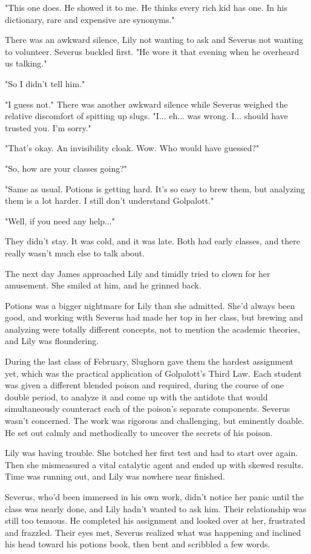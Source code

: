 "This one does. He showed it to me. He thinks every rich kid has one. In his dictionary, rare and expensive are synonyms."

There was an awkward silence, Lily not wanting to ask and Severus not wanting to volunteer. Severus buckled first. "He wore it that evening when he overheard us talking."

"So I didn't tell him."

"I guess not." There was another awkward silence while Severus weighed the relative discomfort of spitting up slugs. "I... eh... was wrong. I... should have trusted you. I'm sorry."

"That's okay. An invisibility cloak. Wow. Who would have guessed?"

"So, how are your classes going?"

"Same as usual. Potions is getting hard. It's so easy to brew them, but analyzing them is a lot harder. I still don't understand Golpalott."

"Well, if you need any help..."

They didn't stay. It was cold, and it was late. Both had early classes, and there really wasn't much else to talk about.

The next day James approached Lily and timidly tried to clown for her amusement. She smiled at him, and he grinned back.

Potions was a bigger nightmare for Lily than she admitted. She'd always been good, and working with Severus had made her top in her class, but brewing and analyzing were totally different concepts, not to mention the academic theories, and Lily was floundering.

During the last class of February, Slughorn gave them the hardest assignment yet, which was the practical application of Golpalott's Third Law. Each student was given a different blended poison and required, during the course of one double period, to analyze it and come up with the antidote that would simultaneously counteract each of the poison's separate components. Severus wasn't concerned. The work was rigorous and challenging, but eminently doable. He set out calmly and methodically to uncover the secrets of his poison.

Lily was having trouble. She botched her first test and had to start over again. Then she mismeasured a vital catalytic agent and ended up with skewed results. Time was running out, and Lily was nowhere near finished.

Severus, who'd been immersed in his own work, didn't notice her panic until the class was nearly done, and Lily hadn't wanted to ask him. Their relationship was still too tenuous. He completed his assignment and looked over at her, frustrated and frazzled. Their eyes met, Severus realized what was happening and inclined his head toward his potions book, then bent and scribbled a few words.

